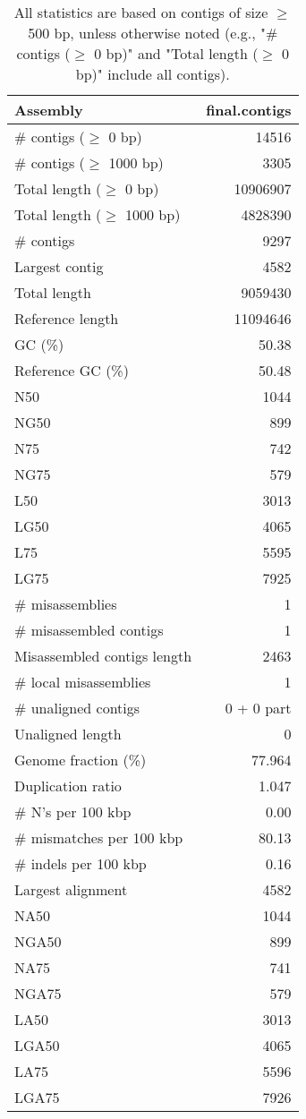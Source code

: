 \documentclass[12pt,a4paper]{article}
\begin{document}
\begin{table}[ht]
\begin{center}
\caption{All statistics are based on contigs of size $\geq$ 500 bp, unless otherwise noted (e.g., "\# contigs ($\geq$ 0 bp)" and "Total length ($\geq$ 0 bp)" include all contigs).}
\begin{tabular}{|l*{1}{|r}|}
\hline
Assembly & final.contigs \\ \hline
\# contigs ($\geq$ 0 bp) & 14516 \\ \hline
\# contigs ($\geq$ 1000 bp) & 3305 \\ \hline
Total length ($\geq$ 0 bp) & 10906907 \\ \hline
Total length ($\geq$ 1000 bp) & 4828390 \\ \hline
\# contigs & 9297 \\ \hline
Largest contig & 4582 \\ \hline
Total length & 9059430 \\ \hline
Reference length & 11094646 \\ \hline
GC (\%) & 50.38 \\ \hline
Reference GC (\%) & 50.48 \\ \hline
N50 & 1044 \\ \hline
NG50 & 899 \\ \hline
N75 & 742 \\ \hline
NG75 & 579 \\ \hline
L50 & 3013 \\ \hline
LG50 & 4065 \\ \hline
L75 & 5595 \\ \hline
LG75 & 7925 \\ \hline
\# misassemblies & 1 \\ \hline
\# misassembled contigs & 1 \\ \hline
Misassembled contigs length & 2463 \\ \hline
\# local misassemblies & 1 \\ \hline
\# unaligned contigs & 0 + 0 part \\ \hline
Unaligned length & 0 \\ \hline
Genome fraction (\%) & 77.964 \\ \hline
Duplication ratio & 1.047 \\ \hline
\# N's per 100 kbp & 0.00 \\ \hline
\# mismatches per 100 kbp & 80.13 \\ \hline
\# indels per 100 kbp & 0.16 \\ \hline
Largest alignment & 4582 \\ \hline
NA50 & 1044 \\ \hline
NGA50 & 899 \\ \hline
NA75 & 741 \\ \hline
NGA75 & 579 \\ \hline
LA50 & 3013 \\ \hline
LGA50 & 4065 \\ \hline
LA75 & 5596 \\ \hline
LGA75 & 7926 \\ \hline
\end{tabular}
\end{center}
\end{table}
\end{document}
